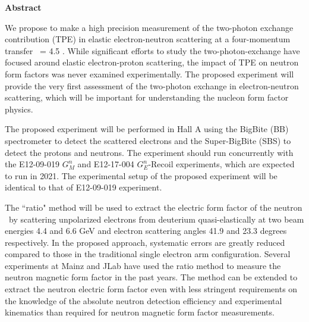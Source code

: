 \begin{center}
{{\large {\bf Abstract}}} 
\end{center}

We propose to make a high precision measurement of the two-photon exchange contribution (TPE) in elastic electron-neutron scattering at a four-momentum transfer \qsq~= 4.5 \gevcsq. 
While significant efforts to study the two-photon-exchange have focused around elastic electron-proton scattering, the impact of TPE on neutron form factors was never examined experimentally. 
The proposed experiment will provide the very first assessment of the two-photon exchange in electron-neutron scattering, which will be important for understanding the nucleon form factor physics. \par
The proposed experiment will be performed in Hall A using the BigBite (BB) spectrometer to detect the scattered electrons and the Super-BigBite (SBS) to detect the protons and neutrons. 
The experiment should run concurrently with the E12-09-019 $G_M^n$ and E12-17-004 $G_E^n$-Recoil experiments, which are expected to run in 2021. 
The experimental setup of the proposed experiment will be identical to that of E12-09-019 experiment. \par
The ``ratio" method will be used to extract the electric form factor of the neutron \gen~by scattering unpolarized electrons from deuterium quasi-elastically at two beam energies 4.4 and 6.6 GeV and electron scattering angles 41.9 and 23.3 degrees respectively. 
In the proposed approach, systematic errors are greatly reduced compared to those in the traditional single electron arm configuration. 
Several experiments at Mainz and JLab have used the ratio method to measure the neutron magnetic form factor in the past years. 
The method can be extended to extract the neutron electric form factor even with less stringent requirements 
on the knowledge of the absolute neutron detection efficiency and experimental kinematics than required for neutron magnetic form factor measurements.  

